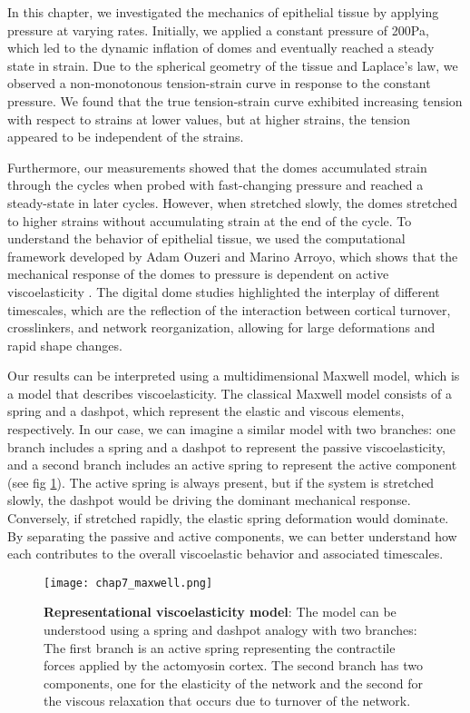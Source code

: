In this chapter, we investigated the mechanics of epithelial tissue by
applying pressure at varying rates. Initially, we applied a constant
pressure of 200Pa, which led to the dynamic inflation of domes and
eventually reached a steady state in strain. Due to the spherical
geometry of the tissue and Laplace's law, we observed a non-monotonous
tension-strain curve in response to the constant pressure. We found that
the true tension-strain curve exhibited increasing tension with respect
to strains at lower values, but at higher strains, the tension appeared
to be independent of the strains.

Furthermore, our measurements showed that the domes accumulated strain
through the cycles when probed with fast-changing pressure and reached a
steady-state in later cycles. However, when stretched slowly, the domes
stretched to higher strains without accumulating strain at the end of
the cycle. To understand the behavior of epithelial tissue, we used the
computational framework developed by Adam Ouzeri and Marino Arroyo,
which shows that the mechanical response of the domes to pressure is
dependent on active viscoelasticity \cite{ouzeri2023}. The digital dome studies
highlighted the interplay of different timescales, which are the
reflection of the interaction between cortical turnover, crosslinkers,
and network reorganization, allowing for large deformations and rapid
shape changes.

Our results can be interpreted using a multidimensional Maxwell model,
which is a model that describes viscoelasticity. The classical Maxwell
model consists of a spring and a dashpot, which represent the elastic
and viscous elements, respectively. In our case, we can imagine a
similar model with two branches: one branch includes a spring and a
dashpot to represent the passive viscoelasticity, and a second branch
includes an active spring to represent the active component (see fig
\ref{fig_7_9}). The active spring is always present, but if the system is
stretched slowly, the dashpot would be driving the dominant mechanical
response. Conversely, if stretched rapidly, the elastic spring
deformation would dominate. By separating the passive and active
components, we can better understand how each contributes to the overall
viscoelastic behavior and associated timescales.

\begin{figure}
	\centering
	\texttt{[image: chap7\_maxwell.png]}
	\caption{\label{fig_7_9} \textbf{Representational viscoelasticity model}: The model can be understood using a spring and dashpot analogy with two branches: The first branch is an active spring representing the contractile forces applied by the actomyosin cortex. The second branch has two components, one for the elasticity of the network and the second for the viscous relaxation that occurs due to turnover of the network.
	}
\end{figure}

